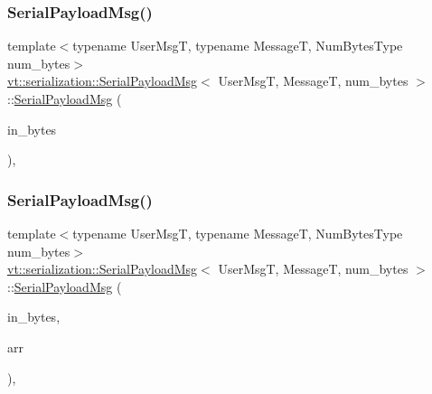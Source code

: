 \subsubsection{\texorpdfstring{Serial\+Payload\+Msg()}{SerialPayloadMsg()}\hspace{0.1cm}{\footnotesize\ttfamily [2/3]}}
{\footnotesize\ttfamily template$<$typename User\+MsgT, typename MessageT, Num\+Bytes\+Type num\+\_\+bytes$>$ \\
\hyperlink{structvt_1_1serialization_1_1_serial_payload_msg}{vt\+::serialization\+::\+Serial\+Payload\+Msg}$<$ User\+MsgT, MessageT, num\+\_\+bytes $>$\+::\hyperlink{structvt_1_1serialization_1_1_serial_payload_msg}{Serial\+Payload\+Msg} (\begin{DoxyParamCaption}\item[{\hyperlink{namespacevt_1_1serialization_aaa03b9b407ed5776043c163629312e40}{Num\+Bytes\+Type} const \&}]{in\+\_\+bytes }\end{DoxyParamCaption})\hspace{0.3cm}{\ttfamily [inline]}, {\ttfamily [explicit]}}

\mbox{\label{structvt_1_1serialization_1_1_serial_payload_msg_a7d764a97a65d9a801f72f83ebe025f80}} 
\subsubsection{\texorpdfstring{Serial\+Payload\+Msg()}{SerialPayloadMsg()}\hspace{0.1cm}{\footnotesize\ttfamily [3/3]}}
{\footnotesize\ttfamily template$<$typename User\+MsgT, typename MessageT, Num\+Bytes\+Type num\+\_\+bytes$>$ \\
\hyperlink{structvt_1_1serialization_1_1_serial_payload_msg}{vt\+::serialization\+::\+Serial\+Payload\+Msg}$<$ User\+MsgT, MessageT, num\+\_\+bytes $>$\+::\hyperlink{structvt_1_1serialization_1_1_serial_payload_msg}{Serial\+Payload\+Msg} (\begin{DoxyParamCaption}\item[{\hyperlink{namespacevt_1_1serialization_aaa03b9b407ed5776043c163629312e40}{Num\+Bytes\+Type} const \&}]{in\+\_\+bytes,  }\item[{std\+::array$<$ \hyperlink{namespacevt_aab8d55968084610ce3b17057981e9300}{Byte\+Type}, num\+\_\+bytes $>$ \&\&}]{arr }\end{DoxyParamCaption})\hspace{0.3cm}{\ttfamily [inline]}, {\ttfamily [explicit]}}



